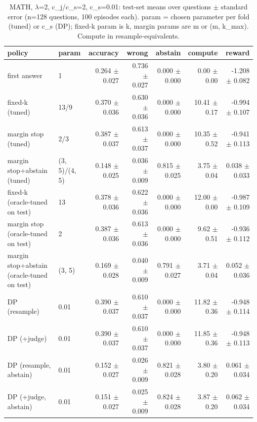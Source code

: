 \begin{table}[t]
\centering
\small
\caption{MATH, $\lambda$=2, c\_j/c\_s=2, c\_s=0.01: test-set means over questions $\pm$ standard error (n=128 questions, 100 episodes each). param = chosen parameter per fold (tuned) or c\_s (DP); fixed-k param is k, margin params are m or (m, k\_max). Compute in resample-equivalents.}
\label{tab:headline_math_lam2_jr2}
\begin{tabular}{llrrrrr}
\toprule
policy & param & accuracy & wrong & abstain & compute & reward \\
\midrule
first answer & 1 & 0.264 $\pm$ 0.027 & 0.736 $\pm$ 0.027 & 0.000 $\pm$ 0.000 & 0.00 $\pm$ 0.00 & -1.208 $\pm$ 0.082 \\
fixed-k (tuned) & 13/9 & 0.370 $\pm$ 0.036 & 0.630 $\pm$ 0.036 & 0.000 $\pm$ 0.000 & 10.41 $\pm$ 0.17 & -0.994 $\pm$ 0.107 \\
margin stop (tuned) & 2/3 & 0.387 $\pm$ 0.037 & 0.613 $\pm$ 0.037 & 0.000 $\pm$ 0.000 & 10.35 $\pm$ 0.52 & -0.941 $\pm$ 0.113 \\
margin stop+abstain (tuned) & (3, 5)/(4, 5) & 0.148 $\pm$ 0.025 & 0.036 $\pm$ 0.009 & 0.815 $\pm$ 0.025 & 3.75 $\pm$ 0.04 & 0.038 $\pm$ 0.033 \\
fixed-k (oracle-tuned on test) & 13 & 0.378 $\pm$ 0.036 & 0.622 $\pm$ 0.036 & 0.000 $\pm$ 0.000 & 12.00 $\pm$ 0.00 & -0.987 $\pm$ 0.109 \\
margin stop (oracle-tuned on test) & 2 & 0.387 $\pm$ 0.036 & 0.613 $\pm$ 0.036 & 0.000 $\pm$ 0.000 & 9.62 $\pm$ 0.51 & -0.936 $\pm$ 0.112 \\
margin stop+abstain (oracle-tuned on test) & (3, 5) & 0.169 $\pm$ 0.028 & 0.040 $\pm$ 0.009 & 0.791 $\pm$ 0.027 & 3.71 $\pm$ 0.04 & 0.052 $\pm$ 0.036 \\
DP (resample) & 0.01 & 0.390 $\pm$ 0.037 & 0.610 $\pm$ 0.037 & 0.000 $\pm$ 0.000 & 11.82 $\pm$ 0.36 & -0.948 $\pm$ 0.114 \\
DP (+judge) & 0.01 & 0.390 $\pm$ 0.037 & 0.610 $\pm$ 0.037 & 0.000 $\pm$ 0.000 & 11.85 $\pm$ 0.36 & -0.948 $\pm$ 0.113 \\
DP (resample, abstain) & 0.01 & 0.152 $\pm$ 0.027 & 0.026 $\pm$ 0.009 & 0.821 $\pm$ 0.028 & 3.80 $\pm$ 0.20 & 0.061 $\pm$ 0.034 \\
DP (+judge, abstain) & 0.01 & 0.151 $\pm$ 0.027 & 0.025 $\pm$ 0.009 & 0.824 $\pm$ 0.028 & 3.87 $\pm$ 0.20 & 0.062 $\pm$ 0.034 \\
\bottomrule
\end{tabular}
\end{table}

